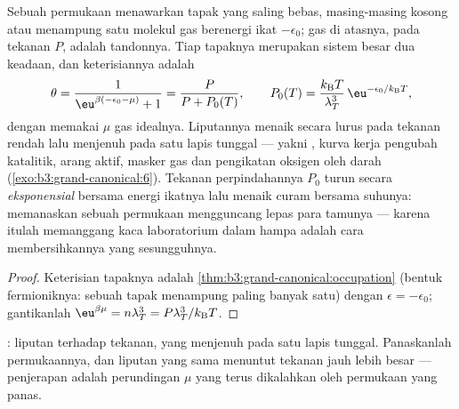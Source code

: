 \begin{proposition}\label{prop:b3:grand-canonical:langmuir}
Sebuah permukaan menawarkan tapak yang saling bebas, masing-masing
kosong atau menampung satu molekul gas berenergi ikat $-\epsilon_0$;
gas di atasnya, pada tekanan $P$, adalah tandonnya. Tiap tapaknya
merupakan sistem besar dua keadaan, dan keterisiannya adalah
\[
\theta = \frac{1}{\eu^{\beta(-\epsilon_0 - \mu)} + 1}
 = \frac{P}{P + P_0(T)} , \qquad
P_0(T) = \frac{k_{\text{B}}T}{\lambda_T^3}\,
\eu^{-\epsilon_0/k_{\text{B}}T} ,
\]
dengan memakai $\mu$ gas idealnya. Liputannya menaik secara lurus pada
tekanan rendah lalu menjenuh pada satu lapis tunggal --- yakni
\emph{}, kurva kerja pengubah katalitik, arang aktif,
masker gas dan pengikatan oksigen oleh darah
(\cref{exo:b3:grand-canonical:6}). Tekanan perpindahannya $P_0$ turun
secara \emph{eksponensial} bersama energi ikatnya lalu menaik curam
bersama suhunya: memanaskan sebuah permukaan mengguncang lepas para
tamunya --- karena itulah memanggang kaca laboratorium dalam hampa
adalah cara membersihkannya yang sesungguhnya.
\end{proposition}

\begin{proof}
Keterisian tapaknya adalah
\cref{thm:b3:grand-canonical:occupation} (bentuk fermioniknya: sebuah
tapak menampung paling banyak satu) dengan $\epsilon = -\epsilon_0$;
gantikanlah $\eu^{\beta\mu} = n\lambda_T^3 = P\lambda_T^3/k_{\text{B}}T$.
\end{proof}

\begin{omfigure}

{\small {}: liputan terhadap tekanan, yang menjenuh pada
satu lapis tunggal. Panaskanlah permukaannya, dan liputan yang sama
menuntut tekanan jauh lebih besar --- penjerapan adalah perundingan $\mu$
yang terus dikalahkan oleh permukaan yang panas.}
\end{omfigure}

